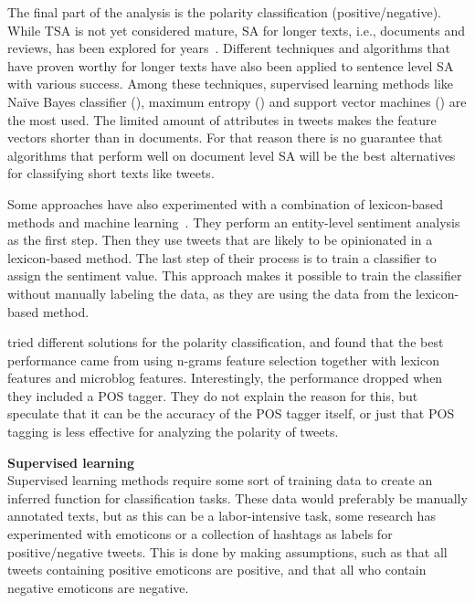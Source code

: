 The final part of the analysis is the polarity classification (positive/negative). While TSA is not yet considered mature, SA for longer texts, i.e., documents and reviews, has been explored for years~\citep{book:pang}. Different techniques and algorithms that have proven worthy for longer texts have also been applied to sentence level SA with various success. Among these techniques, supervised learning methods like Naïve Bayes classifier (), maximum entropy () and support vector machines () are the most used. The limited amount of attributes in tweets makes the feature vectors shorter than in documents. For that reason there is no guarantee that algorithms that perform well on document level SA will be the best alternatives for classifying short texts like tweets.

Some approaches have also experimented with a combination of lexicon-based methods and  machine learning~\citep{article:mudinas}. They perform an entity-level sentiment analysis as the first step. Then they use tweets that are likely to be opinionated in a lexicon-based method. The last step of their process is to train a classifier to assign the sentiment value. This approach makes it possible to train the classifier without manually labeling the data, as they are using the data from the lexicon-based method.

\cite{article:omg} tried different solutions for the polarity classification, and found that the best performance came from using n-grams feature selection together with lexicon features and microblog features. Interestingly, the performance dropped when they included a POS tagger. They do not explain the reason for this, but speculate that it can be the accuracy of the POS tagger itself, or just that POS tagging is less effective for analyzing the polarity of tweets.\vspace{8mm}

\noindent
\textbf{Supervised learning} \\
\noindent
Supervised learning methods require some sort of training data to create an inferred function for classification tasks. These data would preferably be manually annotated texts, but as this can be a labor-intensive task, some research has experimented with emoticons or a collection of hashtags as labels for positive/negative tweets. This is done by making assumptions, such as that all tweets containing positive emoticons are positive, and that all who contain negative emoticons are negative.


